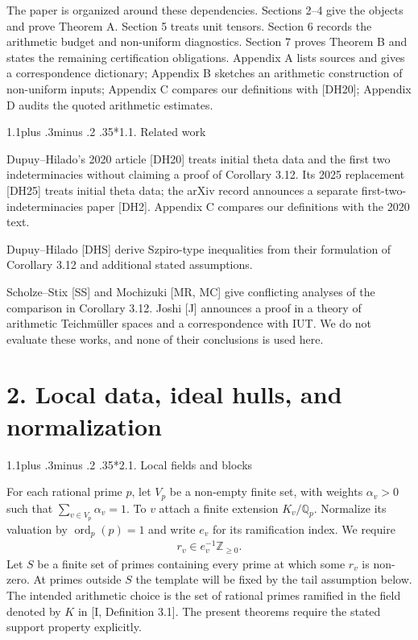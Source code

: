\documentclass[11pt,a4paper]{amsart}
\makeatletter
\renewcommand\subsection{\@startsection{subsection}{2}{\z@}
{1.1\baselineskip plus .3\baselineskip minus .2\baselineskip}
{.35\baselineskip}{\normalfont\bfseries}}
\makeatother
\begin{document}
The paper is organized around these dependencies. Sections 2--4 give the objects and prove Theorem A. Section 5 treats unit tensors. Section 6 records the arithmetic budget and non-uniform diagnostics. Section 7 proves Theorem B and states the remaining certification obligations. Appendix A lists sources and gives a correspondence dictionary; Appendix B sketches an arithmetic construction of non-uniform inputs; Appendix C compares our definitions with [DH20]; Appendix D audits the quoted arithmetic estimates.


\subsection*{1.1. Related work}

Dupuy--Hilado's 2020 article [DH20] treats initial theta data and the first two indeterminacies without claiming a proof of Corollary 3.12. Its 2025 replacement [DH25] treats initial theta data; the arXiv record announces a separate first-two-indeterminacies paper [DH2]. Appendix C compares our definitions with the 2020 text.


Dupuy--Hilado [DHS] derive Szpiro-type inequalities from their formulation of Corollary 3.12 and additional stated assumptions.


Scholze--Stix [SS] and Mochizuki [MR, MC] give conflicting analyses of the comparison in Corollary 3.12. Joshi [J] announces a proof in a theory of arithmetic Teichmüller spaces and a correspondence with IUT. We do not evaluate these works, and none of their conclusions is used here.


\section*{2. Local data, ideal hulls, and normalization}

\subsection*{2.1. Local fields and blocks}

For each rational prime $p$, let $V_p$ be a non-empty finite set, with weights $\alpha_v>0$ such that $\sum_{v\in V_p}\alpha_v=1$. To $v$ attach a finite extension $K_v/\mathbb Q_p$. Normalize its valuation by $\operatorname{ord}_p(p)=1$ and write $e_v$ for its ramification index. We require
\begin{equation}
\begin{gathered}
r_v\in e_v^{-1}\mathbb Z_{\ge0}.
\end{gathered}
\tag{2.1}\label{eq:2.1}
\end{equation}
Let $S$ be a finite set of primes containing every prime at which some $r_v$ is non-zero. At primes outside $S$ the template will be fixed by the tail assumption below. The intended arithmetic choice is the set of rational primes ramified in the field denoted by $K$ in [I, Definition 3.1]. The present theorems require the stated support property explicitly.
\end{document}
